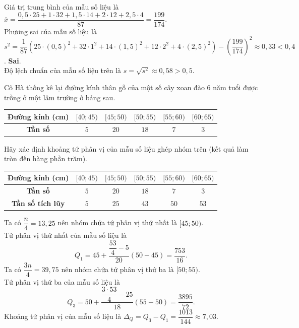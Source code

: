 \begin{ex}
{\begin{itemchoice}
\begin{center}
\begin{tabular}{|c|c|c|c|c|c|}
					\hline
				\end{tabular}
			\end{center}
			Giá trị trung bình của mẫu số liệu là\\ $\overline{x}=\dfrac{0{,}5\cdot 25+1\cdot 32+1{,5}\cdot 14+2\cdot 12+2{,5}\cdot 4}{87}=\dfrac{199}{174}$.\\
			Phương sai của mẫu số liệu là\\ $s^2=\dfrac{1}{87}\left(25\cdot (0{,}5)^2+32\cdot 1^2+14\cdot (1{,}5)^2+12\cdot 2^2+4\cdot (2{,}5)^2\right)-\left(\dfrac{199}{174}\right)^2\approx 0{,}33<0{,}4$.
			\itemch \textbf{Sai}.\\
			Độ lệch chuẩn của mẫu số liệu trên là  $s=\sqrt{s^2}\approx 0{,}58>0{,}5$.
		\end{itemchoice}
	}
\end{ex}

\begin{bt}%
	Cô Hà thống kê lại đường kính thân gỗ của một số cây xoan đào 6 năm tuổi được trồng ở một lâm trường ở bảng sau.
	\begin{center}
		\begin{tabular}{|c|c|c|c|c|c|}
			\hline
			\textbf{Đường kính (cm)} & $[40;45)$ & $[45;50)$ & $[50;55)$ & $[55;60)$ & $[60;65)$ \\ \hline
			\textbf{Tần số}          & $5$           & $20$          & $18$          & $7$           & $3$           \\ \hline
		\end{tabular}
	\end{center}
	Hãy xác định khoảng tứ phân vị của mẫu số liệu ghép nhóm trên (kết quả làm tròn đến hàng phần trăm).
	\loigiai
	{
		\begin{center}
			\begin{tabular}{|c|c|c|c|c|c|}
				\hline
				\textbf{Đường kính (cm)} & $[40;45)$ & $[45;50)$ & $[50;55)$ & $[55;60)$ & $[60;65)$ \\ \hline
				\textbf{Tần số}          & $5$           & $20$          & $18$          & $7$           & $3$           \\ \hline
				\textbf{Tần số tích lũy} & $5$ & $25$ & $43$ & $50$ & $53$\\\hline
			\end{tabular}
		\end{center}
		Ta có $\dfrac{n}{4}=13,25$ nên nhóm chứa tứ phân vị thứ nhất là $[45;50)$.\\
		Tứ phân vị thứ nhất của mẫu số liệu là
		\[Q_1=45+\dfrac{\dfrac{53}{4}-5}{20}(50-45)=\dfrac{753}{16}. \]
		Ta có $\dfrac{3n}{4}=39,75$ nên nhóm chứa tứ phân vị thứ ba là $[50;55)$.\\
		Tứ phân vị thứ ba của mẫu số liệu là
		\[Q_3=50+\dfrac{\dfrac{3\cdot 53}{4}-25}{18}(55-50)=\dfrac{3895}{72}. \]
		Khoảng tứ phân vị của mẫu số liệu là $\Delta_Q=Q_3-Q_1=\dfrac{1013}{144}\approx 7{,}03$.
	}
\end{bt}

